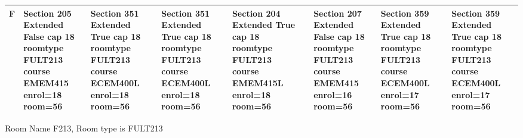 \documentclass{article} \usepackage[margin=0.5in]{geometry}
\newcommand{\textgr}[1]{\cellcolor{gray!40}\textbf{#1}}
\begin{document}
\begin{tabular}{|c|z|z|z|z|z|z|z|z|}
\hline
\textgr{F} &  Section 205 Extended False cap 18 roomtype FULT213 course EMEM415 enrol=18 room=56 & Section 351 Extended True cap 18 roomtype FULT213 course ECEM400L enrol=18 room=56 & Section 351 Extended True cap 18 roomtype FULT213 course ECEM400L enrol=18 room=56 & Section 204 Extended True cap 18 roomtype FULT213 course EMEM415L enrol=18 room=56 &  & Section 207 Extended False cap 18 roomtype FULT213 course EMEM415 enrol=16 room=56 & Section 359 Extended True cap 18 roomtype FULT213 course ECEM400L enrol=17 room=56 & Section 359 Extended True cap 18 roomtype FULT213 course ECEM400L enrol=17 room=56 \\[65pt]
\hline
\end{tabular}

	
Room Name F213, Room type is FULT213 
\newpage
	
\end{document}
